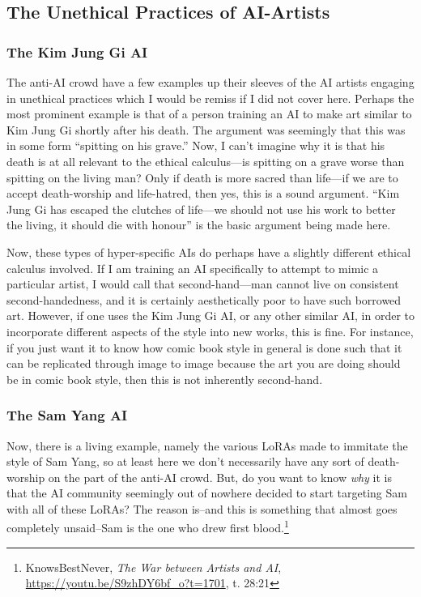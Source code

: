 \documentclass[11pt]{article}
\begin{document}
\subsection*{The Unethical Practices of AI-Artists}
\label{sec:org1ea05e9}
\subsubsection*{The Kim Jung Gi AI}
\label{sec:org99f636c}
The anti-AI crowd have a few examples up their sleeves of the AI artists engaging in unethical practices which I would be remiss if I did not cover here. Perhaps the most prominent example is that of a person training an AI to make art similar to Kim Jung Gi shortly after his death. The argument was seemingly that this was in some form ``spitting on his grave.'' Now, I can't imagine why it is that his death is at all relevant to the ethical calculus---is spitting on a grave worse than spitting on the living man? Only if death is more sacred than life---if we are to accept death-worship and life-hatred, then yes, this is a sound argument. ``Kim Jung Gi has escaped the clutches of life---we should not use his work to better the living, it should die with honour'' is the basic argument being made here.

Now, these types of hyper-specific AIs do perhaps have a slightly different ethical calculus involved. If I am training an AI specifically to attempt to mimic a particular artist, I would call that second-hand---man cannot live on consistent second-handedness, and it is certainly aesthetically poor to have such borrowed art. However, if one uses the Kim Jung Gi AI, or any other similar AI, in order to incorporate different aspects of the style into new works, this is fine. For instance, if you just want it to know how comic book style in general is done such that it can be replicated through image to image because the art you are doing should be in comic book style, then this is not inherently second-hand.

\subsubsection*{The Sam Yang AI}
\label{sec:org7e3a4ca}
Now, there is a living example, namely the various LoRAs made to immitate the style of Sam Yang, so at least here we don't necessarily have any sort of death-worship on the part of the anti-AI crowd. But, do you want to know \emph{why} it is that the AI community seemingly out of nowhere decided to start targeting Sam with all of these LoRAs? The reason is--and this is something that almost goes completely unsaid--Sam is the one who drew first blood.\footnote{KnowsBestNever, \emph{The War between Artists and AI}, \url{https://youtu.be/S9zhDY6bf\_o?t=1701}, t. 28:21}
\end{document}
